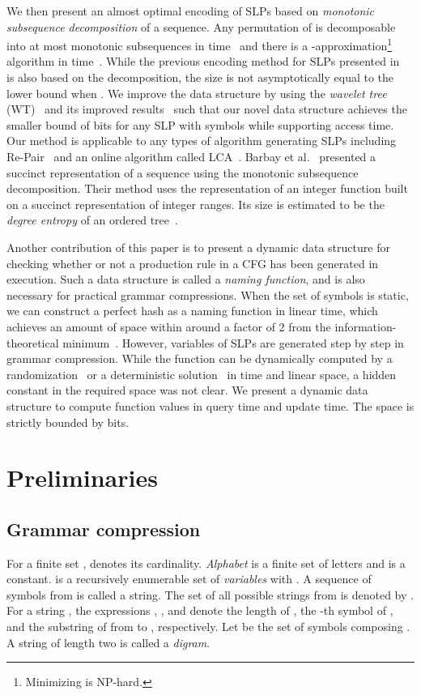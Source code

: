 \documentclass[10pt]{llncs}
\begin{document}
We then present an almost optimal encoding of SLPs based on
{\em monotonic subsequence decomposition} of a sequence.
Any permutation of  is decomposable into at most 
monotonic subsequences in  time~\cite{Yehuda1998} and
there is a -approximation\footnote{Minimizing  is NP-hard.} 
algorithm in  time~\cite{Fomin2002}. 
While the previous encoding method for SLPs presented in~\cite{Takabatake2012} 
is also based on the decomposition, the size is not asymptotically equal
to the lower bound when .
We improve the data structure by using the {\em wavelet tree} (WT)~\cite{Grossi03} and its improved results~\cite{Jeremy2010,Golynski2006} such that
our novel data structure achieves the smaller bound of  
bits for any SLP with  symbols while supporting  access time.
Our method is applicable to any types of algorithm generating SLPs
including Re-Pair~\cite{Larsson00} and an online algorithm called LCA~\cite{Maruyama2012}.
Barbay et al.~\cite{Barbay2009} presented a succinct representation of a sequence using the monotonic subsequence decomposition. 
Their method uses the representation of an integer function built on a succinct representation of integer ranges. 
Its size is estimated to be the {\em degree entropy} of an ordered tree~\cite{Jansson2012-JCSS}.

Another contribution of this paper is to present a dynamic data structure for checking whether or not a production rule in a CFG has been generated in execution. 
Such a data structure is called a {\em naming function}, and is also necessary for practical grammar compressions. 
When the set of symbols is static, we can construct a perfect hash as a naming function in linear time, which achieves 
an amount of space within around a factor of 2 from the information-theoretical minimum~\cite{Botelho2007}.
However, variables of SLPs are generated step by step in grammar compression.
While the function can be dynamically computed by a randomization~\cite{Karp87} or
a deterministic solution~\cite{Karp72} in  time and linear space,
a hidden constant in the required space was not clear.
We present a dynamic data structure to compute function values in  query time
and update time. The space is strictly bounded by  bits.

\section{Preliminaries}

\subsection{Grammar compression}
For a finite set ,  denotes its cardinality.
{\em Alphabet}  is a finite set of letters and  is a constant. 
 is a recursively enumerable set 
of {\em variables} with .
A sequence of symbols from  is called a string.
The set of all possible strings from  is denoted by .
For a string , the expressions , , and  
denote the length of , the -th symbol of ,
and the substring of  from  to , respectively.
Let  be the set of symbols composing .
A string of length two is called a {\em digram}.
\end{document}
